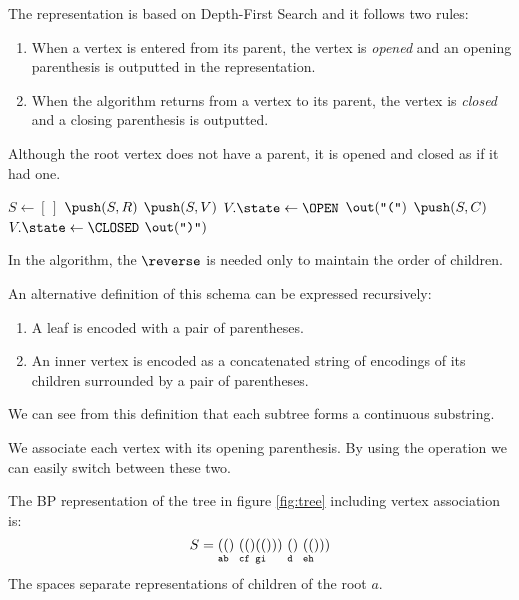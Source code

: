 The representation is based on Depth-First Search and it follows two rules:
\begin{enumerate}
	\item When a vertex is entered from its parent, the vertex is \emph{opened} and an opening parenthesis is outputted in the representation.
	\item When the algorithm returns from a vertex to its parent, the vertex is \emph{closed} and a closing parenthesis is outputted.
\end{enumerate}
Although the root vertex does not have a parent, it is opened and closed as if it had one.

\begin{algorithm}
\begin{algorithmic}
	\State $S \gets [\,]$%
	\Instr $\push(S, R)$ 
		 
			\State $\push(S, V)$ 
			\State $V.\state \gets \OPEN$
			\State $\out(\openingParen)$
				\State $\push(S, C)$
			\EndFor
		 
			\State $V.\state \gets \CLOSED$
			\State $\out(\closingParen)$
		\EndIf
	\EndWhile
\EndFunction
\end{algorithmic}
\end{algorithm}

In the algorithm, the $\reverse$ is needed only to maintain the order of children.

An alternative definition of this schema can be expressed recursively:
\begin{enumerate}
	\item A leaf is encoded with a pair of parentheses.
	\item An inner vertex is encoded as a concatenated string of encodings of its children surrounded by a pair of parentheses.
\end{enumerate}
We can see from this definition that each subtree forms a continuous substring.

We associate each vertex with its opening parenthesis.
By using the operation \match{} we can easily switch between these two.

\begin{example}
	The BP representation of the tree in figure \ref{fig:tree} including vertex association is:
	$$ S = \mathtt{ \x(a \x(b) ~ \x(c \x(f ) \x(g \x(i) ) ) ~ \x(d) ~ \x(e \x(h) ) ) }$$ 
	The spaces separate representations of children of the root $a$.
\end{example}

